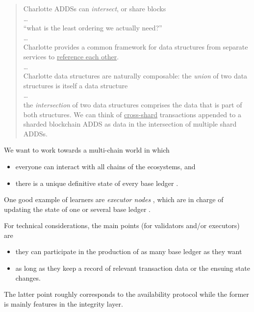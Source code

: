 \documentclass[dvipsnames]{article}
\theoremstyle{definition}
\newcommand{\base}[1][ ]{%
  base ledger%
  \ifthenelse{\equal{#1}{ }}{}{#1}
}
\begin{document}
{{\begin{quote}
    Charlotte ADDSs can \emph{intersect}, or share blocks
    \\…\\
    “what is the least ordering we actually need?”
    \\…\\
    Charlotte provides a common framework for data structures from separate
    services to \ul{reference each other}.
    \\…\\
    Charlotte data structures are naturally composable: the \emph{union} of two data structures is itself a
    data structure
    \\…\\
    the \emph{intersection} of two data
    structures comprises the data that is part of both structures. We can think of \ul{cross-shard} transactions
    appended to a sharded blockchain ADDS as data in the intersection of multiple shard ADDSs.
  \end{quote}
  }%
}



We want to work towards a multi-chain world in
which
\begin{itemize}
\item everyone can interact with all chains of the ecosystems, %
  and %
\item there is a unique definitive state of every \base.
\end{itemize}

One good example of learners are \emph{executor nodes} %
\cite{anoma_specs}, %
which are in charge of updating the state of one or several \base. %


For technical considerations,
the main points (for validators and/or executors) are
\begin{itemize}
\item they can participate in the production of as many \base[s] as they want
\item as long as they keep a record of relevant %
  transaction data or the ensuing state changes. %
\end{itemize}

The latter point roughly corresponds to the availability protocol %
while the former is mainly features in the integrity layer. %
\end{document}
